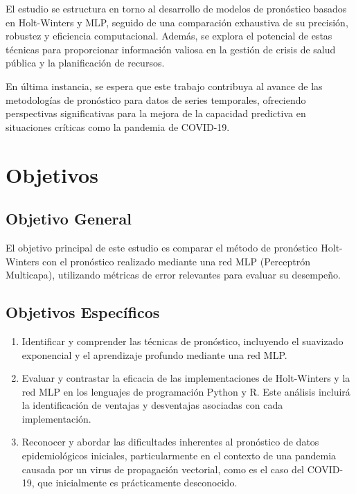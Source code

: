 \documentclass[
  us-letterpaper,
]{scrreprt}
\theoremstyle{plain}
\theoremstyle{definition}
\theoremstyle{plain}
\theoremstyle{definition}
\theoremstyle{remark}
\begin{document}
El estudio se estructura en torno al desarrollo de modelos de pronóstico
basados en Holt-Winters y MLP, seguido de una comparación exhaustiva de
su precisión, robustez y eficiencia computacional. Además, se explora el
potencial de estas técnicas para proporcionar información valiosa en la
gestión de crisis de salud pública y la planificación de recursos.

En última instancia, se espera que este trabajo contribuya al avance de
las metodologías de pronóstico para datos de series temporales,
ofreciendo perspectivas significativas para la mejora de la capacidad
predictiva en situaciones críticas como la pandemia de COVID-19.


\chapter*{Objetivos}\label{objetivos}


\section*{Objetivo General}\label{objetivo-general}


El objetivo principal de este estudio es comparar el método de
pronóstico Holt-Winters con el pronóstico realizado mediante una red MLP
(Perceptrón Multicapa), utilizando métricas de error relevantes para
evaluar su desempeño.

\section*{Objetivos Específicos}\label{objetivos-especuxedficos}


\begin{enumerate}
\def\labelenumi{\arabic{enumi}.}
\item
  Identificar y comprender las técnicas de pronóstico, incluyendo el
  suavizado exponencial y el aprendizaje profundo mediante una red MLP.
\item
  Evaluar y contrastar la eficacia de las implementaciones de
  Holt-Winters y la red MLP en los lenguajes de programación Python y R.
  Este análisis incluirá la identificación de ventajas y desventajas
  asociadas con cada implementación.
\item
  Reconocer y abordar las dificultades inherentes al pronóstico de datos
  epidemiológicos iniciales, particularmente en el contexto de una
  pandemia causada por un virus de propagación vectorial, como es el
  caso del COVID-19, que inicialmente es prácticamente desconocido.
\end{enumerate}
\end{document}
